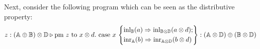 \begin{example}
Next, consider the following program which can be seen as the distributive property:
\begin{equation*}
  \begin{split}
    z:(\mathbb{A} \oplus \mathbb{\mathbb{B}}) \otimes \mathbb{\mathbb{D}} \triangleright \text{pm } z \text{ to } x \otimes d. \text{ case } x\,\left\{ 
      \begin{aligned}
    &\mathrm{inl}_{\mathbb{B}}(a) \Rightarrow \mathrm{inl}_{\mathbb{B} \otimes \mathbb{D}}(a \otimes d); \\
    & \mathrm{inr}_{\mathbb{A}}(b) \Rightarrow \mathrm{inr}_{\mathbb{A} \otimes \mathbb{D}} (b \otimes d)
      \end{aligned}
    \right\}: (\mathbb{A} \otimes \mathbb{D}) \oplus (\mathbb{B} \otimes \mathbb{D})
\end{split}
\end{equation*}


\end{example}
